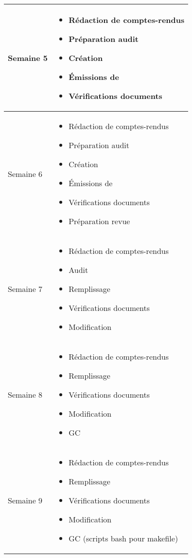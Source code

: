 \documentclass [a4paper] {article}
\begin{document}
\section*{\Pierre}

\begin{tabularx}{16.8cm}{|>{\columncolor{gray!40}}l|X|}
	\hline
	Semaine 5 & \begin{itemize}
	\item Rédaction de comptes-rendus
	\item Préparation audit
	\item Création \TB{}
	\item Émissions de \FT{}
	\item Vérifications documents
\end{itemize}	 \\
	\hline
	
	Semaine 6 & \begin{itemize}
	\item Rédaction de comptes-rendus
	\item Préparation audit
	\item Création \TB{}
	\item Émissions de \FT{}
	\item Vérifications documents
	\item Préparation revue
\end{itemize}	 \\
	\hline
	
	Semaine 7 & \begin{itemize}
	\item Rédaction de comptes-rendus
	\item Audit
	\item Remplissage \TB{}
	\item Vérifications documents
	\item Modification \PQ{}
\end{itemize}	 \\
	\hline
	
	Semaine 8 & \begin{itemize}
	\item Rédaction de comptes-rendus
	\item Remplissage \TB{}
	\item Vérifications documents
	\item Modification \PQ{}
	\item GC
\end{itemize}	 \\
	\hline
	
	Semaine 9 & \begin{itemize}
	\item Rédaction de comptes-rendus
	\item Remplissage \TB{}
	\item Vérifications documents
	\item Modification \PQ{}
	\item GC (scripts bash pour makefile)
	

\end{itemize}
\end{tabularx}
\end{document}
